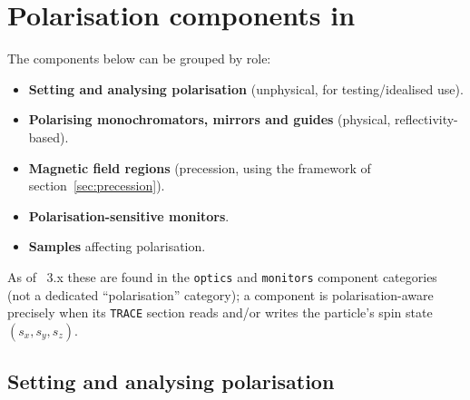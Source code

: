\section{Polarisation components in \MCS}
\label{sec:new}

The components below can be grouped by role:
\begin{itemize}
\item \textbf{Setting and analysing polarisation} (unphysical, for testing/idealised use).
\item \textbf{Polarising monochromators, mirrors and guides} (physical, reflectivity-based).
\item \textbf{Magnetic field regions} (precession, using the framework of section~\ref{sec:precession}).
\item \textbf{Polarisation-sensitive monitors}.
\item \textbf{Samples} affecting polarisation.
\end{itemize}
As of \MCS~3.x these are found in the \texttt{optics} and \texttt{monitors}
component categories (not a dedicated ``polarisation'' category); a
component is polarisation-aware precisely when its \texttt{TRACE} section
reads and/or writes the particle's spin state $(s_x,s_y,s_z)$.

\subsection{Setting and analysing polarisation}

